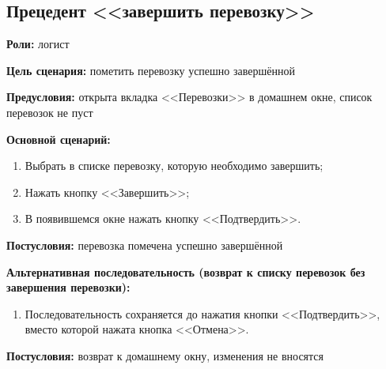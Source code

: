 \subsection{Прецедент <<завершить перевозку>>}
\textbf{Роли:} логист \par
\textbf{Цель сценария:} пометить перевозку успешно завершённой \par
\textbf{Предусловия:} открыта вкладка <<Перевозки>> в домашнем окне, 
     список перевозок не пуст \par
\textbf{Основной сценарий:} 
\begin{enumerate}
    \item Выбрать в списке перевозку, которую необходимо завершить;
    \item Нажать кнопку <<Завершить>>;
    \item В появившемся окне нажать кнопку <<Подтвердить>>.
\end{enumerate} \par
\textbf{Постусловия:} перевозка помечена успешно завершённой \par
\textbf{Альтернативная последовательность 
    (возврат к списку перевозок без завершения перевозки):} \par
\begin{enumerate}
    \item Последовательность сохраняется до нажатия кнопки <<Подтвердить>>, 
        вместо которой нажата кнопка <<Отмена>>.
\end{enumerate} \par
\textbf{Постусловия:} возврат к домашнему окну, изменения не вносятся \par

